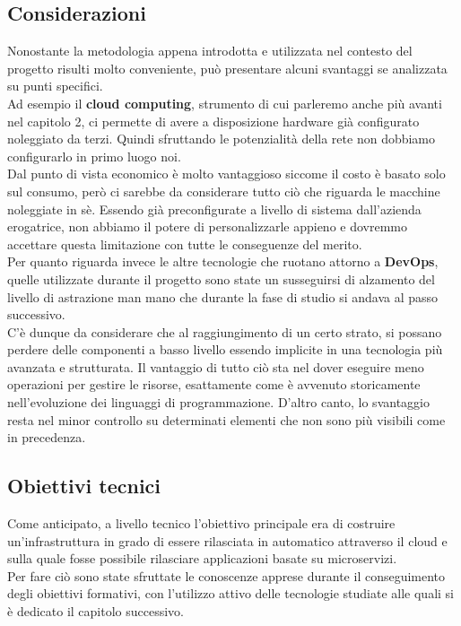 \documentclass[a4paper,12pt]{report}
\begin{document}
\subsection{Considerazioni}
Nonostante la metodologia appena introdotta e utilizzata nel contesto del progetto risulti molto conveniente, può presentare alcuni svantaggi se analizzata su punti specifici.\\
Ad esempio il \textbf{cloud computing}, strumento di cui parleremo anche più avanti nel capitolo 2, ci permette di avere a disposizione hardware già configurato noleggiato da terzi. Quindi sfruttando le potenzialità della rete non dobbiamo configurarlo in primo luogo noi.\cite{cloud}\\ Dal punto di vista economico è molto vantaggioso siccome il costo è basato solo sul consumo, però ci sarebbe da considerare tutto ciò che riguarda le macchine noleggiate in sè. Essendo già preconfigurate a livello di sistema dall'azienda erogatrice, non abbiamo il potere di personalizzarle appieno e dovremmo accettare questa limitazione con tutte le conseguenze del merito.\\
Per quanto riguarda invece le altre tecnologie che ruotano attorno a \textbf{DevOps}, quelle utilizzate durante il progetto sono state un susseguirsi di alzamento del livello di astrazione man mano che durante la fase di studio si andava al passo successivo.\\
C'è dunque da considerare che al raggiungimento di un certo strato, si possano perdere delle componenti a basso livello essendo implicite in una tecnologia più avanzata e strutturata. Il vantaggio di tutto ciò sta nel dover eseguire meno operazioni per gestire le risorse, esattamente come è avvenuto storicamente nell'evoluzione dei linguaggi di programmazione. D'altro canto, lo svantaggio resta nel minor controllo su determinati elementi che non sono più visibili come in precedenza.


\subsection{Obiettivi tecnici}
Come anticipato, a livello tecnico l'obiettivo principale era di costruire un'infrastruttura in grado di essere rilasciata in automatico attraverso il cloud e sulla quale fosse possibile rilasciare applicazioni basate su microservizi.\\
Per fare ciò sono state sfruttate le conoscenze apprese durante il conseguimento degli obiettivi formativi, con l'utilizzo attivo delle tecnologie studiate alle quali si è dedicato il capitolo successivo.
\end{document}
